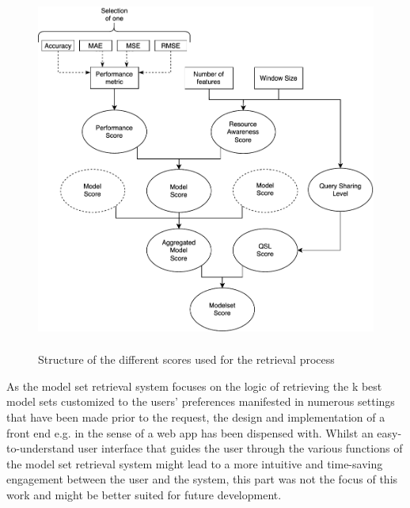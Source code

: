 \begin{figure}[htbp]
  \centering
\includegraphics[height=12cm]{graphics/scores.pdf}
  \caption{Structure of the different scores used for the retrieval process}
  \label{scoreconstruction}
\end{figure}


As the model set retrieval system focuses on the logic of retrieving the k best model sets customized to the users’ preferences manifested in numerous settings that have been made prior to the request, the design and implementation of a front end e.g. in the sense of a web app has been dispensed with. Whilst an easy-to-understand user interface that guides the user through the various functions of the model set retrieval system might lead to a more intuitive and time-saving engagement between the user and the system, this part was not the focus of this work and might be better suited for future development.
